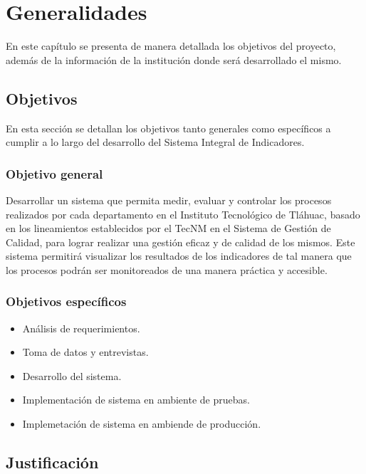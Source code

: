 \chapter{Generalidades}
    En este cap\'itulo se presenta de manera detallada los objetivos del proyecto, adem\'as de la informaci\'on de la instituci\'on donde ser\'a desarrollado el mismo.
    
    \section{Objetivos}
    En esta secci\'on se detallan los objetivos tanto generales como espec\'ificos a cumplir a lo largo del desarrollo del Sistema Integral de Indicadores.

\subsection{Objetivo general}

Desarrollar un sistema que permita medir, evaluar y controlar los procesos realizados por cada departamento en el Instituto Tecnol\'ogico de Tl\'ahuac, basado en los lineamientos establecidos por el TecNM en el Sistema de Gesti\'on de Calidad, para lograr realizar una gesti\'on eficaz y de calidad de los mismos.
Este sistema permitir\'a visualizar los resultados de los indicadores de tal manera que los procesos podr\'an ser monitoreados de una manera pr\'actica y accesible.


\subsection{Objetivos espec\'ificos}
\begin{itemize}
    \item An\'alisis de requerimientos.
    \item Toma de datos y entrevistas.
    \item Desarrollo del sistema.
    \item Implementaci\'on de sistema en ambiente de pruebas.
    \item Implemetaci\'on de sistema en ambiende de producci\'on.
\end{itemize}

\section{Justificaci\'on}
\paragraph{}%

